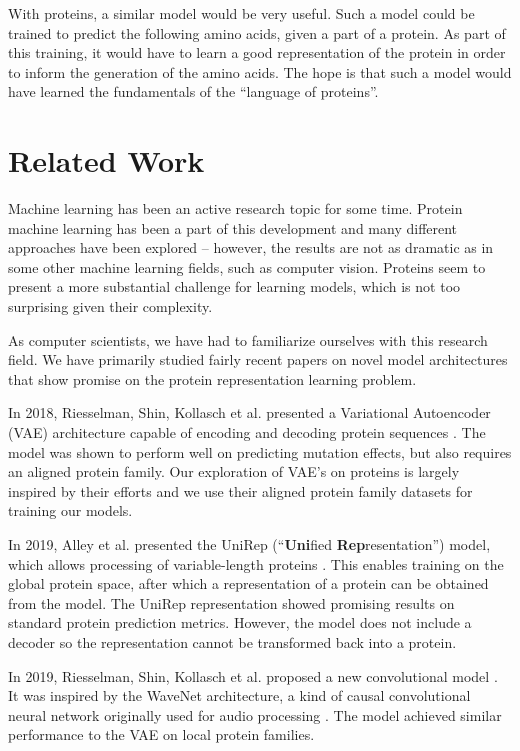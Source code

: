 With proteins, a similar model would be very useful. Such a model could be trained to predict the following amino acids, given a part of a protein. As part of this training, it would have to learn a good representation of the protein in order to inform the generation of the amino acids. The hope is that such a model would have learned the fundamentals of the ``language of proteins''. %

\section{Related Work}
Machine learning has been an active research topic for some time. Protein machine learning has been a part of this development and many different approaches have been explored -- however, the results are not as dramatic as in some other machine learning fields, such as computer vision. Proteins seem to present a more substantial challenge for learning models, which is not too surprising given their complexity.

As computer scientists, we have had to familiarize ourselves with this research field. We have primarily studied fairly recent papers on novel model architectures that show promise on the protein representation learning problem.

In 2018, Riesselman, Shin, Kollasch et al. presented a Variational Autoencoder (VAE) architecture capable of encoding and decoding protein sequences \cite{riesselman2018deep}. The model was shown to perform well on predicting mutation effects, but also requires an aligned protein family. Our exploration of VAE's on proteins is largely inspired by their efforts and we use their aligned protein family datasets for training our models.

In 2019, Alley et al. presented the UniRep (``\textbf{Uni}fied \textbf{Rep}resentation'') model, which allows processing of variable-length proteins \cite{alley2019unified}. This enables training on the global protein space, after which a representation of a protein can be obtained from the model. The UniRep representation showed promising results on standard protein prediction metrics. However, the model does not include a decoder so the representation cannot be transformed back into a protein.

In 2019, Riesselman, Shin, Kollasch et al. proposed a new convolutional model \cite{riesselman2019accelerating}. It was inspired by the WaveNet architecture, a kind of causal convolutional neural network originally used for audio processing \cite{oord2016wavenet}. The model achieved similar performance to the VAE on local protein families. %

